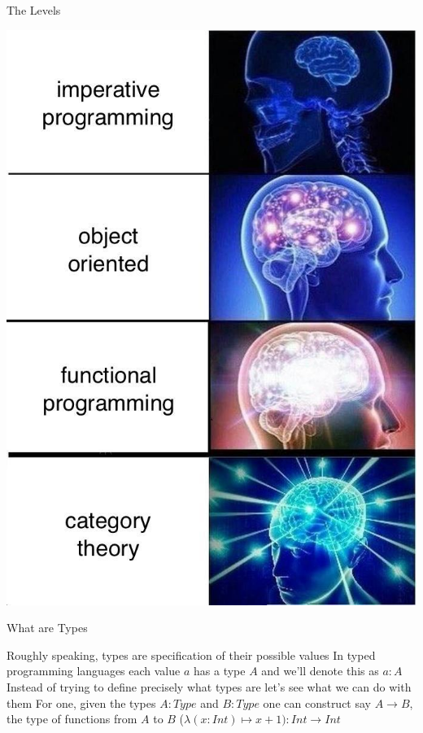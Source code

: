 \documentclass[pdf]{beamer}
\begin{document}
\begin{frame}{The Levels}
  \begin{center}
    \includegraphics[scale=0.23]{images/levels}
  \end{center}
\end{frame}

\begin{frame}{What are Types}
  \begin{outline}
    \1 Roughly speaking, types are specification of their possible values
    \pause
    \1 In typed programming languages each value $a$ has a type $A$ and we'll denote this as $a : A$
    \pause
    \1 Instead of trying to define precisely what types are let's see what we can do with them
    \pause
    \1 For one, given the types $A : Type$ and $B : Type$ one can construct say $A \to B$, the type of functions from $A$ to $B$
    \pause
    \1 ($\lambda (x : Int) \mapsto x + 1) : Int \to Int$
  \end{outline}
\end{frame}
\end{document}
